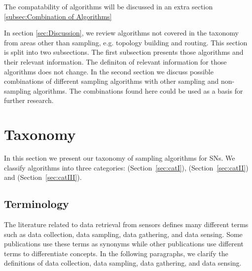 The compatability of algorithms will be discussed in an extra section
\ref{subsec:Combination of Algorithms}


 In section \ref{sec:Discussion}, we review
algorithms not covered in the taxonomy from areas other than sampling, e.g.
topology building and routing. This section is split into two subsections. The
first subsection presents those algorithms and their relevant information. The
definiton of relevant information for those algorithms does not change. In the
second section we discuss possible combinations of different sampling
algorithms with other sampling and non-sampling algorithms. The combinations
found here could be used as a basis for further research.


\section{Taxonomy}
\label{sec:Taxonomy}

In this section we present our taxonomy of sampling algorithms for \acp{SN}. We
classify algorithms into three categories: \catI (Section~\ref{sec:catI}),
\catII (Section~\ref{sec:catII})  and \catIII (Section~\ref{sec:catIII}).



\subsection{Terminology}


The literature related to data retrieval from sensors defines many different
terms such as data collection, data sampling, data gathering, and data sensing.
Some publications use these terms as synonyms while other publications use
different terms to differentiate concepts. In the following paragraphs, we
clarify the definitions of data collection, data sampling, data gathering, and
data sensing.

